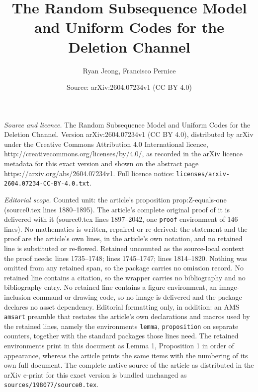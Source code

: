 \documentclass[10pt,a4paper]{amsart}
\title{The Random Subsequence Model and Uniform Codes for the Deletion Channel}
\author{Ryan Jeong, Francisco Pernice}
\date{Source: arXiv:2604.07234v1 (CC BY 4.0)}
\begin{document}
\maketitle

\noindent\emph{Source and licence.} The Random Subsequence Model and Uniform Codes for the Deletion Channel. Version arXiv:2604.07234v1 (CC BY 4.0), distributed by arXiv under the Creative Commons Attribution 4.0 International licence, http://creativecommons.org/licenses/by/4.0/, as recorded in the arXiv licence metadata for this exact version and shown on the abstract page https://arxiv.org/abs/2604.07234v1. Full licence notice: \texttt{licenses/arxiv-2604.07234-CC-BY-4.0.txt}.\par\smallskip

\noindent\textit{Editorial scope.} Counted unit: the article's proposition prop:Z-equals-one (source0.tex lines 1880--1895). The article's complete original proof of it is delivered with it (source0.tex lines 1897--2042, one \texttt{proof} environment of 146 lines). No mathematics is written, repaired or re-derived: the statement and the proof are the article's own lines, in the article's own notation, and no retained line is substituted or re-flowed.  Retained uncounted as the source-local context the proof needs: lines 1735--1748; lines 1745--1747; lines 1814--1820.  Nothing was omitted from any retained span, so the package carries no omission record.  No retained line contains a citation, so the wrapper carries no bibliography and no bibliography entry.  No retained line contains a figure environment, an image-inclusion command or drawing code, so no image is delivered and the package declares no asset dependency.  Editorial formatting only, in addition: an AMS \texttt{amsart} preamble that restates the article's own declarations and macros used by the retained lines, namely the environments \texttt{lemma}, \texttt{proposition} on separate counters, together with the standard packages those lines need.  The retained environments print in this document as Lemma 1, Proposition 1 in order of appearance, whereas the article prints the same items with the numbering of its own full document.  The complete native source of the article as distributed in the arXiv e-print for this exact version is bundled unchanged as \texttt{sources/198077/source0.tex}.
\end{document}
